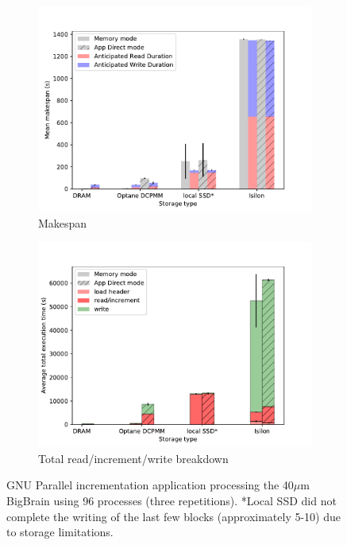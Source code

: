 \begin{figure}
    \begin{subfigure}{0.5\textwidth}
        \centering
        \includegraphics[width=\columnwidth]{figures/optane/makespan-real-40bb_96cpus.pdf}
        \caption{Makespan}\label{fig:optane:makespan-96cpus}
    \end{subfigure}
    \begin{subfigure}{0.5\textwidth}
        \centering
        \includegraphics[width=\columnwidth]{figures/optane/stacked-real-40bb_96cpus.pdf}
        \caption{Total read/increment/write breakdown}\label{fig:optane:stacked-96cpus}
    \end{subfigure}
    \captionsetup{belowskip=-10pt}
    \caption{GNU Parallel incrementation application processing the 40$\mu$m
    BigBrain using 96 processes (three repetitions). *Local SSD did not complete
    the writing of the last few blocks (approximately 5-10) due to storage
    limitations.}
\end{figure}


